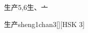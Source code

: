 \begin{entry}{生产}{5,6}{⽣、⼇}
  \begin{phonetics}{生产}{sheng1chan3}[][HSK 3]
  \end{phonetics}
\end{entry}
